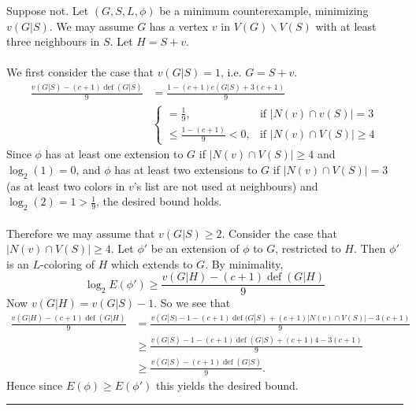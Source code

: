 \documentclass[letterpaper,12pt,oneside,onecolumn]{article}
\newenvironment{proof}{{\bf Proof:  }}{\hfill\rule{2mm}{2mm}}
\DeclareMathOperator{\defi}{def}
\begin{document}
\begin{proof}
	Suppose not. Let $(G,S,L, \phi)$ be a minimum counterexample, minimizing $v(G|S)$. We may assume $G$ has a vertex $v$ in $V(G)\backslash V(S)$ with at least three neighbours in $S$. Let $H = S+v$. 
	\paragraph{}
	We first consider the case that $v(G|S) = 1$, i.e. $G = S + v$.
	\begin{align*}
	\frac{v(G|S) - (c+1)\defi(G|S)}{9} &= \frac{1 - (c+1)e(G|S) +3(c+1)}{9} \\
	&\begin{cases}
		=\frac{1}{9}, &\text{if $|N(v)\cap v(S)| = 3$}  \\
		\leq\frac{1-(c+1)}{9} <0, &\text{if $|N(v) \cap V(S)| \geq 4$}	\end{cases}
	\end{align*}
	Since $\phi$ has at least one extension to $G$ if $|N(v) \cap V(S)| \geq 4$ and $\log_2(1) = 0$, and $\phi$ has at least two extensions to $G$ if $|N(v) \cap V(S)| = 3$ (as at least two colors in $v$'s list are not used at neighbours) and $\log_2(2) = 1 > \frac{1}{9}$, the desired bound holds.
	\paragraph{}
	Therefore we may assume that $v(G|S) \geq 2$. Consider the case that $|N(v) \cap V(S)| \geq 4$. Let $\phi'$ be an extension of $\phi$ to $G$, restricted to $H$. Then $\phi'$ is an $L$-coloring of $H$ which extends to $G$. By minimality, 
	$$\log_2 E(\phi') \geq \frac{v(G|H) - (c+1)\defi(G|H)}{9}$$
	Now $v(G|H) = v(G|S) - 1$. So we see that
	\begin{align*}
	\frac{v(G|H) - (c+1)\defi(G|H)}{9} &= \frac{v(G|S) - 1 -(c+1)\defi(G|S) +(c+1)|N(v)\cap V(S)| - 3(c+1)}{9} \\
	&\geq \frac{v(G|S) - 1 -(c+1)\defi(G|S) +(c+1)4 - 3(c+1)}{9}\\
	&\geq \frac{v(G|S) -(c+1)\defi(G|S)}{9}.
	\end{align*}
	Hence since $E(\phi) \geq E(\phi')$ this yields the desired bound.

\end{proof}
\end{document}
